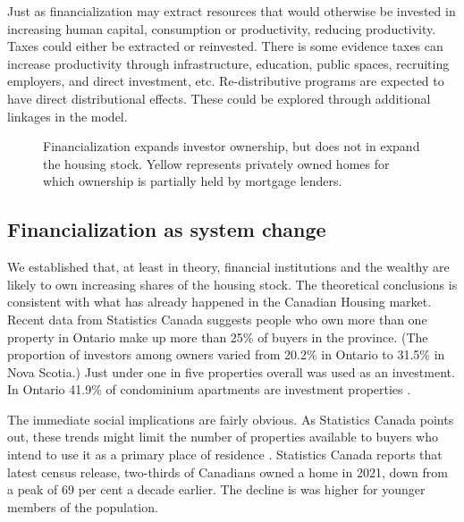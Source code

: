 Just as financialization may extract resources that would otherwise be invested in increasing human capital, consumption or productivity, reducing productivity. Taxes could either be extracted or reinvested. There is some evidence taxes can increase productivity through infrastructure, education, public spaces, recruiting employers, and direct investment, etc. Re-distributive programs are expected to have direct distributional effects. These could be explored through additional linkages in the model.



\begin{figure}[ht]
\begin{center}

\end{center}
\caption[Financialization expands investor ownership, but does not in expand the housing stock]{Financialization expands investor ownership, but does not in expand the housing stock. Yellow represents privately owned homes for which ownership is partially held by mortgage lenders.}
\label{fig-financialization-expansion}
\end{figure}


\subsection{Financialization as system change} \label{section-system}
We established that, at least in theory, financial institutions and the wealthy are likely to own increasing shares of the housing stock. The theoretical conclusions is consistent with what has already happened in the Canadian Housing market. Recent data from Statistics Canada \cite{fontaineResidentialRealEstate2023} suggests people who own more than one property in Ontario make up more than 25\% of buyers in the province. (The proportion of investors among owners varied from 20.2\% in Ontario to 31.5\% in Nova Scotia.)
Just under one in five properties overall was used as an investment.
In Ontario 41.9\% of condominium apartments are investment properties \cite{statisticscanadaBuyRentHousing2022}.

The immediate social implications are fairly obvious. As Statistics Canada points out, these trends might limit the number of properties available to buyers who intend to use it as a primary place of residence  \cite{fontaineResidentialRealEstate2023}. Statistics Canada reports that latest census release, two-thirds of Canadians owned a home in 2021, down from a peak of 69 per cent a decade earlier. The decline is was higher for younger members of the population. 

